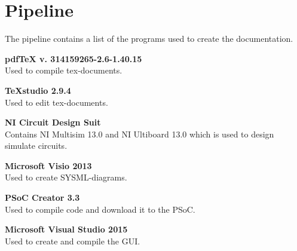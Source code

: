 \section{Pipeline}
The pipeline contains a list of the programs used to create the documentation.

\textbf{pdfTeX v. 314159265-2.6-1.40.15}\\
Used to compile tex-documents.

\textbf{TeXstudio 2.9.4}\\
Used to edit tex-documents.

\textbf{NI Circuit Design Suit}\\
Contains NI Multisim 13.0 and NI Ultiboard 13.0 which is used to design simulate circuits.

\textbf{Microsoft Visio 2013}\\
Used to create SYSML-diagrams.

\textbf{PSoC Creator 3.3}\\
Used to compile code and download it to the PSoC.

\textbf{Microsoft Visual Studio 2015}\\
Used to create and compile the GUI.